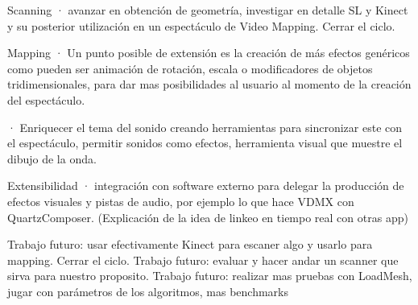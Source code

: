 Scanning
· avanzar en obtención de geometría, investigar en detalle SL y Kinect y su posterior utilización en un espectáculo de Video Mapping. Cerrar el ciclo.

Mapping
· Un punto posible de extensión es la creación de más efectos genéricos como pueden ser animación de rotación, escala o modificadores de objetos tridimensionales, para dar mas posibilidades al usuario al momento de la creación del espectáculo.

· Enriquecer el tema del sonido creando herramientas para sincronizar este con el espectáculo, permitir sonidos como efectos, herramienta visual que muestre el dibujo de la onda.

Extensibilidad
· integración con software externo para delegar la producción de efectos visuales y pistas de audio, por ejemplo lo que hace VDMX con QuartzComposer. (Explicación de la idea de linkeo en tiempo real con otras app)

Trabajo futuro: usar efectivamente Kinect para escaner algo y usarlo para mapping. Cerrar el ciclo.
Trabajo futuro: evaluar y hacer andar un scanner que sirva para nuestro proposito.
Trabajo futuro: realizar mas pruebas con LoadMesh, jugar con parámetros de los algoritmos, mas benchmarks